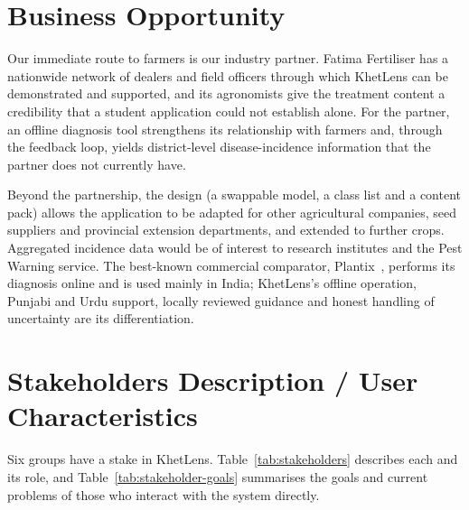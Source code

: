 \section{Business Opportunity}
Our immediate route to farmers is our industry partner. Fatima Fertiliser has a nationwide network of dealers and field officers through which KhetLens can be demonstrated and supported, and its agronomists give the treatment content a credibility that a student application could not establish alone. For the partner, an offline diagnosis tool strengthens its relationship with farmers and, through the feedback loop, yields district-level disease-incidence information that the partner does not currently have.

Beyond the partnership, the design (a swappable model, a class list and a content pack) allows the application to be adapted for other agricultural companies, seed suppliers and provincial extension departments, and extended to further crops. Aggregated incidence data would be of interest to research institutes and the Pest Warning service. The best-known commercial comparator, Plantix~\cite{plantix}, performs its diagnosis online and is used mainly in India; KhetLens's offline operation, Punjabi and Urdu support, locally reviewed guidance and honest handling of uncertainty are its differentiation.

\section{Stakeholders Description / User Characteristics}
Six groups have a stake in KhetLens. Table~\ref{tab:stakeholders} describes each and its role, and Table~\ref{tab:stakeholder-goals} summarises the goals and current problems of those who interact with the system directly.

